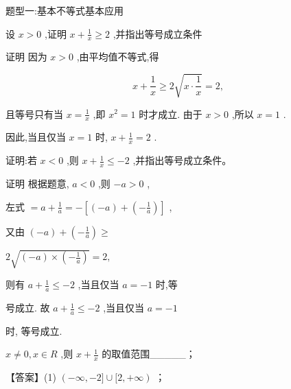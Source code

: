 \documentclass[11pt,a4paper]{article}
\begin{document}
\clearpage
\begin{tcolorbox} 
    \centering
    题型一:基本不等式基本应用
    \end{tcolorbox}
\begin{problem} 
设 \(\displaystyle x > 0\) ,证明 \(\displaystyle x + \frac{1}{x} \geq  2\) ,并指出等号成立条件
\begin{jiexi}[25]
证明 因为 \(\displaystyle x > 0\) ,由平均值不等式,得

\[
x + \frac{1}{x} \geq  2\sqrt{x \cdot  \frac{1}{x}} = 2,
\]

且等号只有当 \(\displaystyle x = \frac{1}{x}\) ,即 \(\displaystyle {x}^{2} = 1\) 时才成立. 由于 \(\displaystyle x > 0\) ,所以 \(\displaystyle x = 1\) .

因此,当且仅当 \(\displaystyle x = 1\) 时, \(\displaystyle x + \frac{1}{x} = 2\) .


\end{jiexi}
\end{problem}
\begin{problem} 
    证明:若 \(\displaystyle x < 0\) ,则 \(\displaystyle x + \frac{1}{x} \leq   - 2\) ,并指出等号成立条件。
    \begin{jiexi}[25]
 证明 根据题意, \(\displaystyle a < 0\) ,则 \(\displaystyle - a > 0\) ,

左式 \(\displaystyle = a + \frac{1}{a} =  - \left\lbrack  {\left( {-a}\right)  + \left( {-\frac{1}{a}}\right) }\right\rbrack\) ,

又由 \(\displaystyle \left( {-a}\right)  + \left( {-\frac{1}{a}}\right)  \geq\)

\(\displaystyle 2\sqrt{\left( {-a}\right)  \times  \left( {-\frac{1}{a}}\right) } = 2,\)

则有 \(\displaystyle a + \frac{1}{a} \leq   - 2\) ,当且仅当 \(\displaystyle a =  - 1\) 时,等

号成立. 故 \(\displaystyle a + \frac{1}{a} \leq   - 2\) ,当且仅当 \(\displaystyle a =  - 1\)

时, 等号成立.


\end{jiexi}
\end{problem}
\begin{problem} \(\displaystyle x \neq  0,x \in  R\) ,则 \(\displaystyle x + \frac{1}{x}\) 的取值范围\_\_\_\_\_；
    \begin{jiexi}
【答案】(1) \(\displaystyle \left( {-\infty , - 2\rbrack \cup \lbrack 2, + \infty }\right)\) ；


\end{jiexi}
\end{problem}
\end{document}

